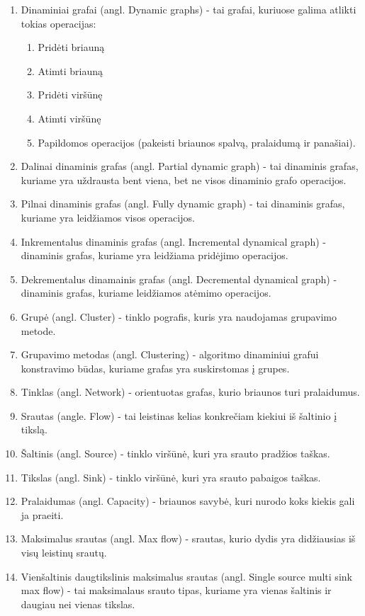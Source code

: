 \begin{enumerate}
	\item Dinaminiai grafai (angl. Dynamic graphs) - tai grafai, kuriuose galima atlikti tokias operacijas:
	\begin{enumerate}
		\item Pridėti briauną
		\item Atimti briauną
		\item Pridėti viršūnę
		\item Atimti viršūnę
		\item Papildomos operacijos (pakeisti briaunos spalvą, pralaidumą ir panašiai).
	\end{enumerate}
	\item Dalinai dinaminis grafas (angl. Partial dynamic graph) - tai dinaminis grafas, kuriame yra uždrausta bent viena, bet ne visos dinaminio grafo operacijos.
	\item Pilnai dinaminis grafas (angl. Fully dynamic graph) - tai dinaminis grafas, kuriame yra leidžiamos visos operacijos.
	\item Inkrementalus dinaminis grafas (angl. Incremental dynamical graph) - dinaminis grafas, kuriame yra leidžiama pridėjimo operacijos.
	\item Dekrementalus dinamainis grafas (angl. Decremental dynamical graph) - dinaminis grafas, kuriame leidžiamos atėmimo operacijos.
	\item Grupė (angl. Cluster) - tinklo pografis, kuris yra naudojamas grupavimo metode.
	\item Grupavimo metodas (angl. Clustering) - algoritmo dinaminiui grafui konstravimo būdas, kuriame grafas yra suskirstomas į grupes.
	\item Tinklas (angl. Network) - orientuotas grafas, kurio briaunos turi pralaidumus.
	\item Srautas (angle. Flow) - tai leistinas kelias konkrečiam kiekiui iš šaltinio į tikslą.
	\item Šaltinis (angl. Source) - tinklo viršūnė, kuri yra srauto pradžios taškas.
	\item Tikslas (angl. Sink) - tinklo viršūnė, kuri yra srauto pabaigos taškas.
	\item Pralaidumas (angl. Capacity) - briaunos savybė, kuri nurodo koks kiekis gali ja praeiti.
	\item  Maksimalus srautas (angl. Max flow) - srautas, kurio dydis yra didžiausias iš visų leistinų srautų.
	\item Vienšaltinis daugtikslinis maksimalus srautas (angl. Single source multi sink max flow) - tai maksimalaus srauto tipas, kuriame yra vienas šaltinis ir daugiau nei vienas tikslas.

\end{enumerate}
